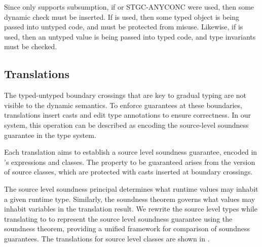 \documentclass[a4paper,USenglish]{tex/lipics-v2016}
\begin{document}
Since \kafka only supports subsumption, if  or \RuleRef
{STGC-ANYCONC} were used, then some dynamic check must be inserted. If
 is used, then some typed object is being passed into
untyped code, and must be protected from misuse. Likewise, if  
is used, then an untyped value is being passed into typed code, and type invariants 
must be checked. 

\subsection{Translations}

The typed-untyped boundary crossings that are key to gradual typing are not
visible to the dynamic semantics. To enforce guarantees at these boundaries,
translations insert casts and edit type annotations to ensure correctness. In
our system, this operation can be described as encoding the source-level
soundness guarantee in the \kafka type system.

Each translation aims to establish a source level soundness guarantee, encoded
in \kafka's expressions and classes.  The property to be guaranteed arises from
the \kafka version of source classes, which are protected with \kafka casts
inserted at boundary crossings.

The source level soundness principal determines what runtime values may
inhabit a given runtime type. Similarly, the \kafka soundness theorem governs
what values may inhabit variables in the translation result. We rewrite the 
source level types while translating to \kafka to represent the source level
soundness guarantee using the \kafka soundness theorem, providing a unified 
framework for comparison of soundness guarantees. The translations for 
source level classes are shown in .
\end{document}
